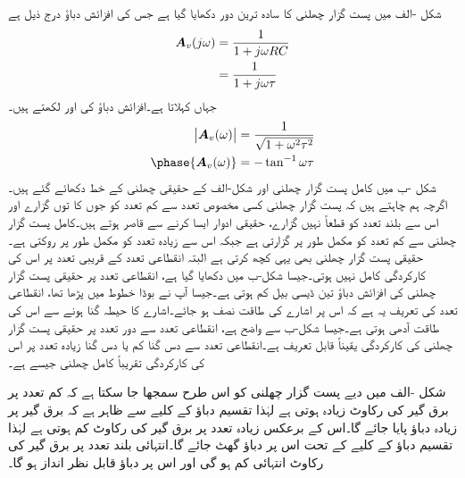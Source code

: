 شکل -الف میں پست گزار چھلنی کا سادہ ترین دور دکھایا گیا ہے جس کی افزائش دباؤ   درج ذیل ہے
\begin{align*}
{\ensuremath{{\boldsymbol{A}}}}_v(j\omega)&=\frac{1}{1+j\omega RC}\\
&=\frac{1}{1+j\omega \tau}
\end{align*} 
جہاں   کہلاتا ہے۔افزائش دباؤ کی   اور  لکھتے ہیں۔
\begin{align*}
\abs{\bA_v(\omega)}&=\frac{1}{\sqrt{1+\omega^2 \tau^2}}\\
\phase{\bA_v(\omega)}&=-\tan^{-1} \omega \tau
\end{align*}
شکل -ب میں کامل پست گزار چھلنی اور شکل-الف کے حقیقی چھلنی کے خط دکھائے گئے ہیں۔ اگرچہ ہم چاہتے ہیں کہ پست گزار چھلنی کسی مخصوص تعدد  سے کم تعدد کو جوں کا توں گزارے اور اس سے بلند تعدد کو قطعاً نہیں گزارے، حقیقی ادوار ایسا کرنے سے قاصر ہوتے ہیں۔کامل پست گزار چھلنی   سے کم تعدد کو مکمل طور پر گزارتی ہے جبکہ اس سے زیادہ تعدد کو مکمل طور پر روکتی ہے۔حقیقی پست گزار چھلنی بھی یہی کچھ کرتی ہے البتہ انقطاعی تعدد کے قریبی تعدد پر اس کی کارکردگی کامل نہیں ہوتی۔جیسا شکل-ب میں دکھایا گیا ہے، انقطاعی تعدد  پر حقیقی پست گزار چھلنی کی افزائش دباؤ  تین ڈیسی بیل کم ہوتی ہے۔جیسا آپ نے بوڈا خطوط میں پڑھا تھا، انقطاعی تعدد کی تعریف یہ ہے کہ اس پر اشارے کی طاقت نصف ہو جائے۔اشارے کا حیطہ  گنا ہونے سے اس کی طاقت آدھی ہوتی ہے۔جیسا شکل-ب سے واضح ہے، انقطاعی تعدد سے دور تعدد پر حقیقی پست گزار چھلنی کی کارکردگی یقیناً قابل تعریف ہے۔انقطاعی تعدد سے دس گنا کم  یا دس گنا زیادہ  تعدد پر اس کی کارکردگی تقریباً کامل چھلنی جیسے ہے۔

شکل -الف میں دیے پست گزار چھلنی کو اس طرح سمجھا جا سکتا ہے کہ کم تعدد پر برق گیر کی رکاوٹ زیادہ ہوتی ہے لہٰذا تقسیم دباؤ کے کلیے سے ظاہر ہے کہ برق گیر پر زیادہ دباؤ پایا جائے گا۔اس کے برعکس زیادہ تعدد پر برق گیر کی رکاوٹ کم ہوتی ہے لہٰذا تقسیم دباؤ کے کلیے کے تحت اس پر دباؤ گھٹ جائے گا۔انتہائی بلند تعدد پر برق گیر کی رکاوٹ انتہائی کم ہو گی اور اس پر دباؤ قابل نظر انداز ہو گا۔

